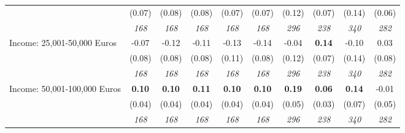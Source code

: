 \begin{tabular}{l c c c c c c c c c}
& (0.07) & (0.08) & (0.08) & (0.07) & (0.07) & (0.12) & (0.07) & (0.14) & (0.06) \\
& \textit{ 168 } & \textit{ 168 } & \textit{ 168 } & \textit{ 168 } & \textit{ 168 } & \textit{ 296 } & \textit{ 238 } & \textit{ 340 } & \textit{ 282 } \\
Income: 25,001-50,000 Euros & -0.07 & -0.12 & -0.11 & -0.13 & -0.14 & -0.04 & \textbf{0.14} & -0.10 & 0.03 \\
& (0.08) & (0.08) & (0.08) & (0.11) & (0.08) & (0.12) & (0.07) & (0.14) & (0.08) \\
& \textit{ 168 } & \textit{ 168 } & \textit{ 168 } & \textit{ 168 } & \textit{ 168 } & \textit{ 296 } & \textit{ 238 } & \textit{ 340 } & \textit{ 282 } \\
Income: 50,001-100,000 Euros & \textbf{ 0.10 } & \textbf{ 0.10 } & \textbf{ 0.11 } & \textbf{0.10} & \textbf{0.10} & \textbf{ 0.19 } & \textbf{0.06} & \textbf{ 0.14 } & -0.01 \\
& (0.04) & (0.04) & (0.04) & (0.04) & (0.04) & (0.05) & (0.03) & (0.07) & (0.05) \\
& \textit{ 168 } & \textit{ 168 } & \textit{ 168 } & \textit{ 168 } & \textit{ 168 } & \textit{ 296 } & \textit{ 238 } & \textit{ 340 } & \textit{ 282 } \\
\bottomrule
\end{tabular}
